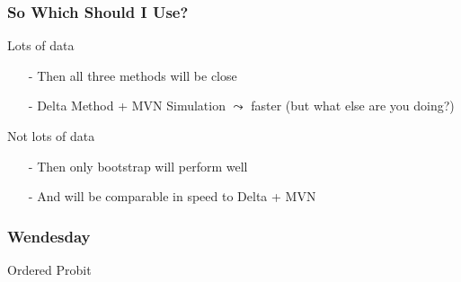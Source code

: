 \documentclass{beamer}
\begin{document}
\begin{frame}
\frametitle{So Which Should I Use?}

Lots of data
\begin{itemize}
\item[-] Then all three methods will be close
\item[-] Delta Method + MVN Simulation $\leadsto$ faster (but what else are you doing?)
\end{itemize}

Not lots of data

\begin{itemize}
\item[-] Then only bootstrap will perform well 
\item[-] And will be comparable in speed to Delta + MVN
\end{itemize}




\end{frame}


\begin{frame}
\frametitle{Wendesday}


Ordered Probit


\end{frame}
\end{document}
